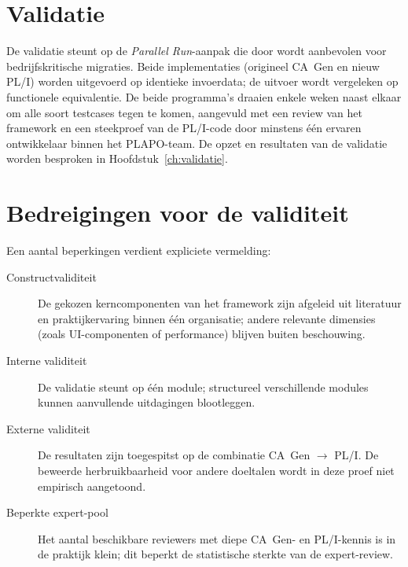\section{Validatie}
\label{sec:meth-validatie}

De validatie steunt op de \emph{Parallel Run}-aanpak die door \textcite{Orosz2022} wordt aanbevolen voor
bedrijfskritische migraties. Beide implementaties (origineel CA~Gen en nieuw PL/I) worden uitgevoerd op
identieke invoerdata; de uitvoer wordt vergeleken op functionele equivalentie. De beide programma's draaien enkele weken naast elkaar om alle soort testcases tegen te komen, aangevuld met een review van het framework
en een steekproef van de PL/I-code door minstens \'e\'en ervaren ontwikkelaar binnen het PLAPO-team. De
opzet en resultaten van de validatie worden besproken in Hoofdstuk~\ref{ch:validatie}.

\section{Bedreigingen voor de validiteit}
\label{sec:meth-bedreigingen}

Een aantal beperkingen verdient expliciete vermelding:
\begin{description}
    \item[Constructvaliditeit] De gekozen kerncomponenten van het framework zijn afgeleid uit literatuur en
        praktijkervaring binnen \'e\'en organisatie; andere relevante dimensies (zoals UI-componenten of
        performance) blijven buiten beschouwing.
    \item[Interne validiteit] De validatie steunt op \'e\'en module; structureel
        verschillende modules kunnen aanvullende uitdagingen blootleggen.
    \item[Externe validiteit] De resultaten zijn toegespitst op de combinatie CA~Gen $\rightarrow$ PL/I. De
        beweerde herbruikbaarheid voor andere doeltalen wordt in deze proef niet empirisch aangetoond.
    \item[Beperkte expert-pool] Het aantal beschikbare reviewers met diepe CA~Gen- en PL/I-kennis is in de
        praktijk klein; dit beperkt de statistische sterkte van de expert-review.
\end{description}
